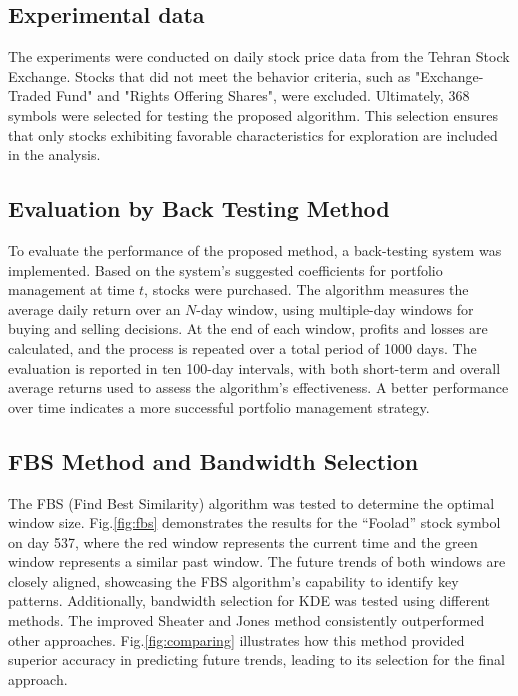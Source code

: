 \documentclass[preprint,12pt,authoryear]{elsarticle}
\begin{document}
\subsection{Experimental data} \label{sec:Experimental data}
The experiments were conducted on daily stock price data from the Tehran Stock Exchange. Stocks that did not meet the behavior criteria, such as {\ttfamily"}Exchange-Traded Fund{\ttfamily"} and {\ttfamily"}Rights Offering Shares{\ttfamily"}, were excluded. Ultimately, 368 symbols were selected for testing the proposed algorithm. This selection ensures that only stocks exhibiting favorable characteristics for exploration are included in the analysis.


\subsection{Evaluation by Back Testing Method}
\label{sec:Eval}
To evaluate the performance of the proposed method, a back-testing system was implemented. Based on the system’s suggested coefficients for portfolio management at time \(t\), stocks were purchased. The algorithm measures the average daily return over an \(N\)-day window, using multiple-day windows for buying and selling decisions. At the end of each window, profits and losses are calculated, and the process is repeated over a total period of 1000 days. The evaluation is reported in ten 100-day intervals, with both short-term and overall average returns used to assess the algorithm’s effectiveness. A better performance over time indicates a more successful portfolio management strategy.

\subsection{FBS Method and Bandwidth Selection}
\label{sec:Eval FBS}

The FBS (Find Best Similarity) algorithm was tested to determine the optimal window size. Fig.\ref{fig:fbs} demonstrates the results for the “Foolad” stock symbol on day 537, where the red window represents the current time and the green window represents a similar past window. The future trends of both windows are closely aligned, showcasing the FBS algorithm's capability to identify key patterns. Additionally, bandwidth selection for KDE was tested using different methods. The improved Sheater and Jones method consistently outperformed other approaches. Fig.\ref{fig:comparing} illustrates how this method provided superior accuracy in predicting future trends, leading to its selection for the final approach.
\end{document}
